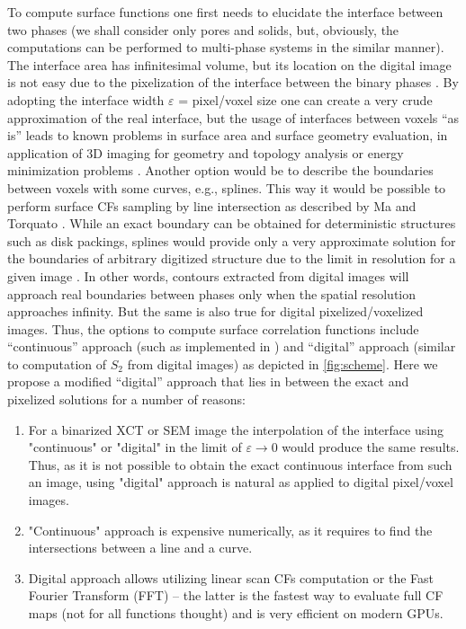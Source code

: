 \documentclass[reprint,amsmath,amssymb,aps,pre,showkeys,showpacs]{revtex4-1}
\begin{document}
To compute surface functions one first needs to elucidate the interface between
two phases (we shall consider only pores and solids, but, obviously, the
computations can be performed to multi-phase systems in the similar manner). The
interface area has infinitesimal volume, but its location on the digital image
is not easy due to the pixelization of the interface between the binary phases
\cite{ma2018SS}. By adopting the interface width $\varepsilon$ = pixel/voxel
size one can create a very crude approximation of the real interface, but the
usage of interfaces between voxels ``as is'' leads to known problems in surface
area and surface geometry evaluation, in application of 3D imaging for geometry
and topology analysis \cite{AWR_PNM,PNM_Morse} or energy minimization problems
\cite{frank2018energy}. Another option would be to describe the boundaries
between voxels with some curves, e.g., splines. This way it would be possible to
perform surface CFs sampling by line intersection as described by Ma and
Torquato \cite{ma2018SS}. While an exact boundary can be obtained for
deterministic structures such as disk packings, splines would provide only a
very approximate solution for the boundaries of arbitrary digitized structure
due to the limit in resolution for a given image \cite{gerke2012tomographic}. In
other words, contours extracted from digital images will approach real
boundaries between phases only when the spatial resolution approaches
infinity. But the same is also true for digital pixelized/voxelized
images. Thus, the options to compute surface correlation functions include
``continuous'' approach (such as implemented in \cite{ma2018SS}) and ``digital''
approach (similar to computation of $S_2$ from digital images) as depicted in
\cref{fig:scheme}. Here we propose a modified ``digital'' approach that lies in
between the exact and pixelized solutions for a number of reasons:
\begin{enumerate}
  \item For a binarized XCT or SEM image the interpolation of the interface
    using "continuous" or "digital" in the limit of $\varepsilon \to 0$ would
    produce the same results. Thus, as it is not possible to obtain the exact
    continuous interface from such an image, using "digital" approach is natural
    as applied to digital pixel/voxel images.
  \item "Continuous" approach is expensive numerically, as it requires to find the
    intersections between a line and a curve.
  \item Digital approach allows utilizing linear scan CFs computation or the
    Fast Fourier Transform (FFT) -- the latter is the fastest way to evaluate
    full CF maps (not for all functions thought) and is very efficient on modern
    GPUs.
\end{enumerate}
\end{document}
